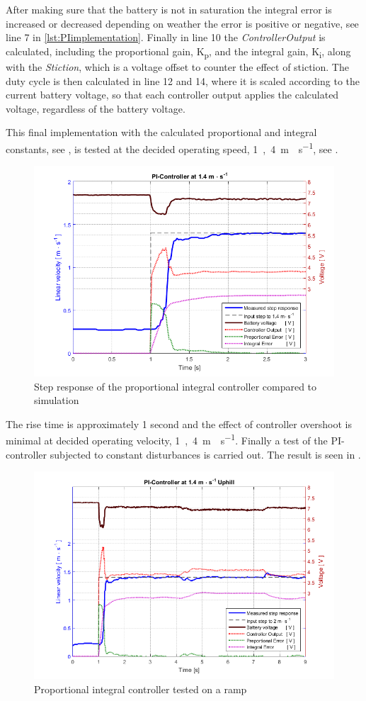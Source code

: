 %
After making sure that the battery is not in saturation the integral error is increased or decreased depending on weather the error is positive or negative, see line 7 in \autoref{lst:PIimplementation}. Finally in line 10 the \emph{ControllerOutput} is calculated, including the proportional gain, \si{K_p}, and the integral gain, \si{K_i}, along with the \emph{Stiction}, which is a voltage offset to counter the effect of stiction.
The duty cycle is then calculated in line 12 and 14, where it is scaled according to the current battery voltage, so that each controller output applies the calculated voltage, regardless of the battery voltage.

This final implementation with the calculated proportional and integral constants, see , is tested at the decided operating speed, \si{1,4 m\cdot s^{-1}}, see .
%
\begin{figure}[H]
 	\centering
 	\includegraphics[width=.9\textwidth]{figures/PInew}
 	\caption{Step response of the proportional integral controller compared to simulation}
 	\label{fig:PInew}
\end{figure}
%
The rise time is approximately 1 second and the effect of controller overshoot is minimal at decided operating velocity, \si{1,4 m\cdot s^{-1}}. Finally a test of the PI-controller subjected to constant disturbances is carried out. The result is seen in .
%
\begin{figure}[H]
 	\centering
 	\includegraphics[width=.9\textwidth]{figures/PIhill}
 	\caption{Proportional integral controller tested on a ramp}
 	\label{fig:PIhill}
\end{figure}
